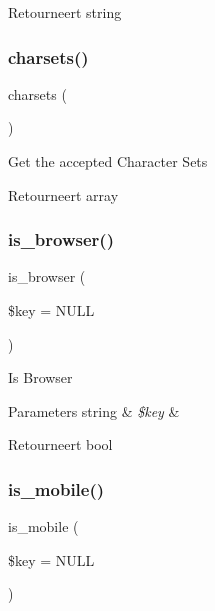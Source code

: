 \begin{DoxyReturn}{Retourneert}
string 
\end{DoxyReturn}
\mbox{\label{class_c_i___user__agent_a1c3819a3fa2777b0b0f2c8ab5d97d833}} 
\subsubsection{\texorpdfstring{charsets()}{charsets()}}
{\footnotesize\ttfamily charsets (\begin{DoxyParamCaption}{ }\end{DoxyParamCaption})}

Get the accepted Character Sets

\begin{DoxyReturn}{Retourneert}
array 
\end{DoxyReturn}
\mbox{\label{class_c_i___user__agent_a3a0c84a9f4a781e53c7529af8a5075ae}} 
\subsubsection{\texorpdfstring{is\_browser()}{is\_browser()}}
{\footnotesize\ttfamily is\+\_\+browser (\begin{DoxyParamCaption}\item[{}]{\$key = {\ttfamily NULL} }\end{DoxyParamCaption})}

Is Browser


\begin{DoxyParams}[1]{Parameters}
string & {\em \$key} & \\
\hline
\end{DoxyParams}
\begin{DoxyReturn}{Retourneert}
bool 
\end{DoxyReturn}
\mbox{\label{class_c_i___user__agent_ab0ec0b7f6a5eeaf00e35743c25e68dfe}} 
\subsubsection{\texorpdfstring{is\_mobile()}{is\_mobile()}}
{\footnotesize\ttfamily is\+\_\+mobile (\begin{DoxyParamCaption}\item[{}]{\$key = {\ttfamily NULL} }\end{DoxyParamCaption})}

